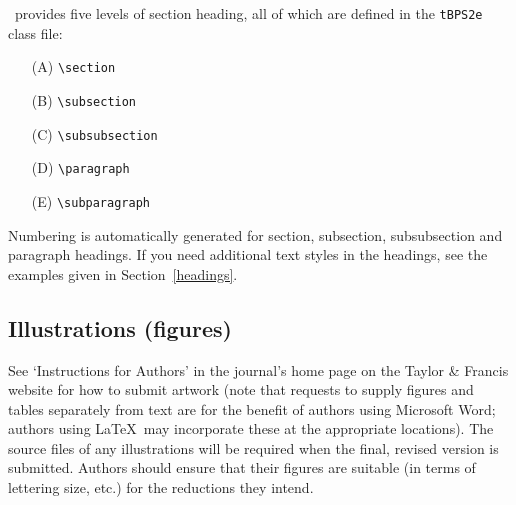 \documentclass{tBPS2e}
\theoremstyle{plain}
\theoremstyle{definition}
\theoremstyle{remark}
\begin{document}
\LaTeXe\ provides five levels of section heading, all of which are defined in the \texttt{tBPS2e} class file:
\begin{enumerate}
  \item[(A)] \verb"\section"
  \item[(B)] \verb"\subsection"
  \item[(C)] \verb"\subsubsection"
  \item[(D)] \verb"\paragraph"
  \item[(E)] \verb"\subparagraph"
\end{enumerate}
Numbering is automatically generated for section, subsection, subsubsection and paragraph headings. If you need
additional text styles in the headings, see the examples given in Section~\ref{headings}.


\subsection{Illustrations (figures)}

See `Instructions for Authors' in the journal's home page on the Taylor \& Francis website for how to submit artwork (note that requests to supply figures and tables separately from text are for the benefit of authors using Microsoft Word; authors using \LaTeX\ may incorporate these at the appropriate locations). The source files of any illustrations will be required when the final, revised version is submitted. Authors should ensure that their figures are suitable (in terms of lettering size, etc.) for the reductions they intend.
\end{document}

